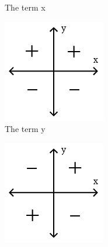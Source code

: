 \begin{figure}[ht]
\begin{subfigure}{.25\textwidth}
  \caption{The term x}
  \label{fig:sign-x}
\end{subfigure}
\begin{subfigure}{.25\textwidth}
  \centering
  \includegraphics[width=0.9\linewidth]{Pictures/signs-in-quadrants-horisontal-cropped.png}
  \caption{The term y}
  \label{fig:sign-y}
\end{subfigure}
\begin{subfigure}{.25\textwidth}
  \centering
  \includegraphics[width=0.9\linewidth]{Pictures/signs-in-quadrants-diagonal-cropped.png}

\end{subfigure}
\end{figure}

